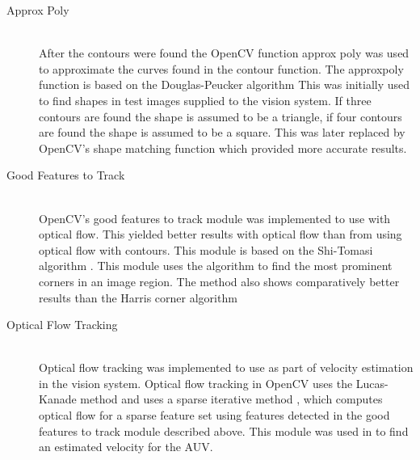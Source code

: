 \begin{description}
\item[Approx Poly]\hfill \\
After the contours were found the OpenCV function approx poly was used to approximate the curves found in the contour function. The approxpoly function is based on the Douglas-Peucker algorithm \cite{article:douglas}
This was initially used to find shapes in test images supplied to the vision system. If three contours are found the shape is assumed to be a triangle, if four contours are found the shape is assumed to be a square. This was later replaced by OpenCV's shape matching function which provided more accurate results.

\item[Good Features to Track]\hfill \\
OpenCV's good features to track module was implemented to use with optical flow. This yielded better results with optical flow than from using optical flow with contours. This module is based on the Shi-Tomasi algorithm \cite{article:tomasi}. This module uses the algorithm to find the most prominent corners in an image region. The method also shows comparatively better results than the Harris corner algorithm \cite{article:tomasi}

\item[Optical Flow Tracking]\hfill \\
Optical flow tracking was implemented to use as part of velocity estimation in the vision system. Optical flow tracking in OpenCV uses the Lucas-Kanade method and uses a sparse iterative method \cite{web:opticalFlow}, which computes optical flow for a sparse feature set using features detected in the good features to track module described above. This module was used in to find an estimated velocity for the AUV.

\end{description}

